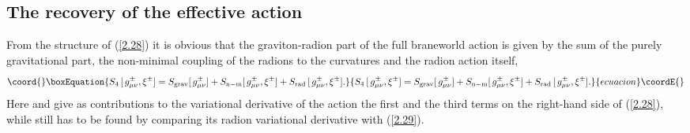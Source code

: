\documentclass[a4paper,preprint,nofootinbib,
                 showpacs,preprintnumbers,amsmath,amssymb]{revtex4}
\begin{document}
 
\subsection{The recovery of the effective action 
\label{action}} 
 From the structure of (\ref{2.28}) it is obvious that the  
graviton-radion part of the full braneworld action  
\coordHE{} is given 
by the sum of the purely gravitational part, the non-minimal 
coupling of the radions to the curvatures and the radion action itself, 
    \begin{equation}\coord{}\boxEquation{ 
    S_4\,[\,g^\pm_{\mu\nu},\xi^\pm] 
    =S_{\rm grav}[\,g^\pm_{\mu\nu}]+ 
    S_{\rm n-m}[\,g^\pm_{\mu\nu},\xi^\pm]+ 
    S_{\rm rad}\,[\,g^\pm_{\mu\nu},\xi^\pm]. 
    }{ 
    S_4\,[\,g^\pm_{\mu\nu},\xi^\pm] 
    =S_{\rm grav}[\,g^\pm_{\mu\nu}]+ 
    S_{\rm n-m}[\,g^\pm_{\mu\nu},\xi^\pm]+ 
    S_{\rm rad}\,[\,g^\pm_{\mu\nu},\xi^\pm]. 
    }{ecuacion}\coordE{}\end{equation} 
Here \coordHE{} and \coordHE{} give as contributions to 
the variational derivative of the action the first and the third 
terms on the right-hand side of (\ref{2.28}), while 
\coordHE{} still has to be 
found by comparing its radion variational derivative with 
(\ref{2.29}). 
 
\end{document}
